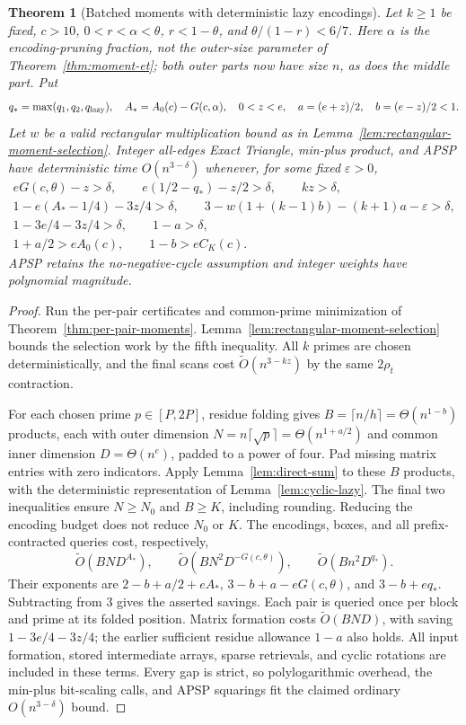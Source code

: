 \documentclass[11pt]{article}
\newtheorem{theorem}{Theorem}
\begin{document}
\begin{theorem}[Batched moments with deterministic lazy encodings]
\label{thm:det-apsp-refined}
Let $k\ge1$ be fixed, $c>10$, $0<r<\alpha<\theta$, $r<1-\theta$,
and $\theta/(1-r)<6/7$. Here $\alpha$ is the encoding-pruning fraction,
not the outer-size parameter of Theorem~\ref{thm:moment-et}; both outer
parts now have size $n$, as does the middle part. Put
\[
q_* = \max(q_1,q_2,q_{\rm lazy}),\quad
A_*=A_0(c)-G(c,\alpha),\quad
0<z<e,\quad a=(e+z)/2,\quad b=(e-z)/2<1.
\]
Let $w$ be a valid rectangular multiplication bound as in
Lemma~\ref{lem:rectangular-moment-selection}. Integer all-edges Exact
Triangle, min-plus product, and APSP have deterministic time
$O(n^{3-\delta})$ whenever, for some fixed $\varepsilon>0$,
\begin{gather*}
eG(c,\theta)-z>\delta,\qquad e(1/2-q_*)-z/2>\delta,\qquad kz>\delta,\\
1-e(A_*-1/4)-3z/4>\delta,\qquad
3-w(1+(k-1)b)-(k+1)a-\varepsilon>\delta,\\
1-3e/4-3z/4>\delta,\qquad 1-a>\delta,\\
1+a/2>eA_0(c),\qquad 1-b>eC_K(c).
\end{gather*}
APSP retains the no-negative-cycle assumption and integer weights have
polynomial magnitude.
\end{theorem}
\begin{proof}
Run the per-pair certificates and common-prime minimization of
Theorem~\ref{thm:per-pair-moments}. Lemma~\ref{lem:rectangular-moment-selection}
bounds the selection work by the fifth inequality. All $k$ primes are
chosen deterministically, and the final scans cost
$\widetilde O(n^{3-kz})$ by the same $2\rho_t$ contraction.

For each chosen prime $p\in[P,2P]$, residue folding gives
$B=\lceil n/h\rceil=\Theta(n^{1-b})$ products, each with outer dimension
$N=n\lceil\sqrt p\rceil=\Theta(n^{1+a/2})$ and common inner dimension
$D=\Theta(n^e)$, padded to a power of four. Pad missing matrix entries
with zero indicators. Apply Lemma~\ref{lem:direct-sum} to these $B$
products, with the deterministic representation of Lemma~\ref{lem:cyclic-lazy}.
The final two inequalities ensure $N\ge N_0$ and $B\ge K$, including
rounding. Reducing the encoding budget does not reduce $N_0$ or $K$.
The encodings, boxes, and all prefix-contracted queries cost, respectively,
\[
\widetilde O(BND^{A_*}),\qquad
\widetilde O(BN^2D^{-G(c,\theta)}),\qquad
\widetilde O(Bn^2D^{q_*}).
\]
Their exponents are $2-b+a/2+eA_*$, $3-b+a-eG(c,\theta)$, and
$3-b+eq_*$. Subtracting from $3$ gives the asserted savings.
Each pair is queried once per block and prime at its folded position.
Matrix formation costs $\widetilde O(BND)$, with saving
$1-3e/4-3z/4$; the earlier sufficient residue allowance $1-a$ also holds.
All input formation, stored intermediate arrays, sparse retrievals, and
cyclic rotations are included in these terms. Every gap is strict, so
polylogarithmic overhead, the min-plus bit-scaling calls, and APSP
squarings fit the claimed ordinary $O(n^{3-\delta})$ bound.
\end{proof}
\end{document}
